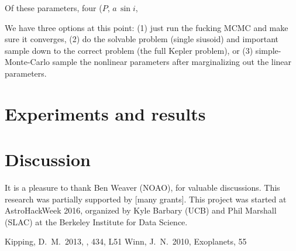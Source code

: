 \documentclass[12pt, preprint]{aastex}
\newcommand{\asini}{a\,\sin i}
\begin{document}
Of these parameters, four ($P$, $\asini$, 

We have three options at this point: (1) just run the fucking MCMC and
make sure it converges, (2) do the solvable problem (single siusoid)
and important sample down to the correct problem (the full Kepler
problem), or (3) simple-Monte-Carlo sample the nonlinear parameters after
marginalizing out the linear parameters.

\section{Experiments and results}

\section{Discussion}

\acknowledgements
It is a pleasure to thank
  Ben Weaver (NOAO),
for valuable discussions.
This research was partially supported by [many grants].
This project was started at AstroHackWeek 2016, organized by Kyle
Barbary (UCB) and Phil Marshall (SLAC) at the Berkeley Institute for
Data Science.

\begin{thebibliography}{99}\raggedright
{}
  Kipping, D.~M.\ 2013, \mnras, 434, L51
  Winn, J.~N.\ 2010, Exoplanets, 55 
\end{thebibliography}
\end{document}
